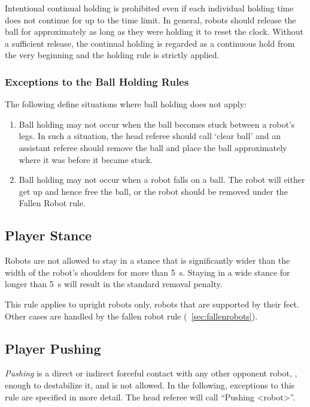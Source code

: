 Intentional continual holding is prohibited even if each individual holding time does not continue for up to the time limit.
In general, robots should release the ball for approximately as long as they were holding it to reset the clock.
Without a sufficient release, the continual holding is regarded as a continuous hold from the very beginning and the holding rule is strictly applied.

\subsubsection{Exceptions to the Ball Holding Rules}
\label{sec:situations_no_ball_holding}

The following define situations where ball holding does not apply:
\begin{enumerate}
  \item Ball holding may not occur when the ball becomes stuck between a robot's legs.
    In such a situation, the head referee should call `clear ball' and an assistant referee should remove the ball and place the ball approximately where it was before it became stuck.
  \item Ball holding may not occur when a robot falls on a ball.
    The robot will either get up and hence free the ball, or the robot should be removed under the Fallen Robot rule.
\end{enumerate}

\subsection{Player Stance}
\label{sec:player_stance}

Robots are not allowed to stay in a stance that is significantly wider than the width of the robot's shoulders for more than \qty{5}{\second}.
Staying in a wide stance for longer than \qty{5}{\second} will result in the standard removal penalty.

This rule applies to upright robots only, \ie robots that are supported by their feet.
Other cases are handled by the fallen robot rule (\cf~\cref{sec:fallenrobots}).

\subsection{Player Pushing}
\label{sec:player_pushing}

\emph{Pushing} is a direct or indirect forceful contact with any other opponent robot, \ie, enough to destabilize it, and is not allowed.
In the following, exceptions to this rule are specified in more detail.
The head referee will call ``Pushing \textless robot\textgreater''.

